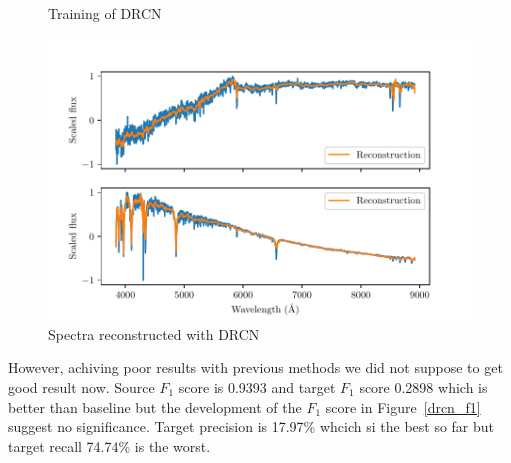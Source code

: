 \begin{figure}
	\caption{Training of DRCN}
	\label{drcn_training}
\end{figure}

\begin{figure}
	\includegraphics[width=\textwidth]{img/reconstructed_spectra.pdf}
	\caption{Spectra reconstructed with DRCN}
	\label{reconstruction}
\end{figure}

However, achiving poor results with previous methods
we did not suppose to get good result now.
Source \(F_1\) score is 0.9393 and target \(F_1\) score 0.2898
which is better than baseline
but the development of the \(F_1\) score in Figure~\ref{drcn_f1} suggest no significance.
Target precision is 17.97\% whcich si the best so far
but target recall 74.74\% is the worst.

